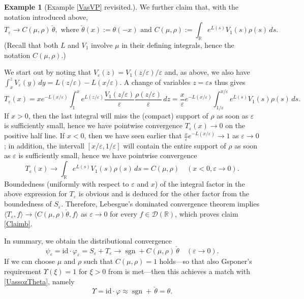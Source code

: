 \documentclass[sumlimits,intlimits,namelimits%
]{amsart}
\newcommand{\D}{\ensuremath{\mathcal{D}}}
\newcommand{\mb}[1]{\ensuremath{\mathbb{#1}}}
\newcommand{\R}{\mb{R}}
\newcommand{\sgn}{\mathop{\mathrm{sgn}}}
\theoremstyle{definition}
\newtheorem{example}[theorem]{Example}
\newcommand{\beq}{\begin{equation}}
\newcommand{\eeq}{\end{equation}}
\newcommand{\dis}[2]{\langle #1 , #2 \rangle}
\newcommand{\eps}{\varepsilon}
\newcommand{\vphi}{\varphi}
\begin{document}
\begin{example}[Example \ref{VasVP} revisited.]
We further claim that, with the notation introduced above,
\beq\label{Claimb}
    T_\eps \to C(\mu,\rho) \,\check{\theta}, 
   \text{ where $\check{\theta}(x) := \theta(-x)$ and $C(\mu,\rho) := \int_\R e^{L(s)} V_1(s) \rho(s)\, ds$}.
\eeq
(Recall that both $L$ and $V_1$ involve $\mu$ in their defining integrals, hence the notation $C(\mu,\rho)$.)

We start out by noting that $V_\eps(z) = V_1(z/\eps)/\eps$ and, as above, we also have $\int_x^z V_\eps(y) \,dy = L(z/\eps) - L(x/\eps)$. A change of variables $z = \eps s$ thus gives
$$
   T_\eps(x) = x e^{- L(x/\eps)} \int_1^x e^{L(z/\eps)} \frac{V_1(z/\eps)}{\eps} \frac{\rho(z/\eps)}{\eps}\, dz
   = \frac{x}{\eps} e^{- L(x/\eps)}  \int_{1/\eps}^{x/\eps} e^{L(s)} V_1(s) \rho(s) \, ds.
$$
If $x > 0$, then the last integral will miss the (compact) support of $\rho$ as soon as $\eps$ is sufficiently small, hence we have pointwise convergence $T_\eps(x) \to 0$ on the positive half line. If $x < 0$, then we have seen earlier that $ \frac{x}{\eps} e^{- L(x/\eps)} \to 1$ as $\eps \to 0$; in addition, the intervall $[x/\eps,1/\eps]$ will contain the entire support of $\rho$ as soon as $\eps$ is sufficiently small, hence we have pointwise convergence
$$
    T_\eps(x) \to  \int_\R e^{L(s)} V_1(s) \rho(s) \, ds = C(\mu,\rho) \quad (x < 0, \eps \to 0).
$$
Boundedness (uniformly with respect to $\eps$ and $x$) of the integral factor in the above expression for $T_\eps$ is obvious and is deduced for the other factor from the boundedness of $S_\eps$. Therefore, Lebesgue's dominated convergence theorem implies $\dis{T_\eps}{f} \to  \dis{C(\mu,\rho) \check{\theta}}{f}$ as $\eps \to 0$ for every $f \in \D(\R)$, which proves claim \eqref{Claimb}.

In summary, we obtain the distributional convergence
$$
 \psi_\eps = \mathrm{id} \cdot \vphi_\eps = S_\eps + T_\eps \to \sgn + C(\mu,\rho) \, \check{\theta} \quad (\eps \to 0).
$$
If we can choose $\mu$ and $\rho$ such that $C(\mu,\rho) = 1$ holds---so that also Gsponer's requirement $\Upsilon(\xi) = 1$ for $\xi > 0$ from \cite{GEW,GPOT} is met---then this achieves a match with \eqref{UassozTheta}, namely
\beq\label{UassozTheta2}
   \Upsilon = \mathrm{id} \cdot \vphi \approx \sgn + \, \check{\theta} = \theta.
\eeq


\end{example}
\end{document}
